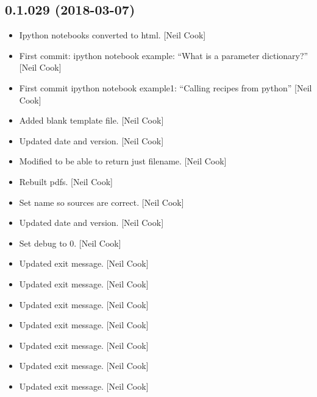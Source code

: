 \documentclass[a4paper,10pt,english]{report}
\begin{document}
\subsection{0.1.029 (2018-03-07)}
\label{\detokenize{misc/changelog:id474}}\begin{itemize}
\item {} 
Ipython notebooks converted to html. {[}Neil Cook{]}

\item {} 
First commit: ipython notebook example: “What is a parameter
dictionary?” {[}Neil Cook{]}

\item {} 
First commit ipython notebook example1: “Calling recipes from python”
{[}Neil Cook{]}

\item {} 
Added blank template file. {[}Neil Cook{]}

\item {} 
Updated date and version. {[}Neil Cook{]}

\item {} 
Modified  to be able to return just filename. {[}Neil
Cook{]}

\item {} 
Rebuilt pdfs. {[}Neil Cook{]}

\item {} 
Set  name so sources are correct. {[}Neil Cook{]}

\item {} 
Updated date and version. {[}Neil Cook{]}

\item {} 
Set debug to 0. {[}Neil Cook{]}

\item {} 
Updated exit message. {[}Neil Cook{]}

\item {} 
Updated exit message. {[}Neil Cook{]}

\item {} 
Updated exit message. {[}Neil Cook{]}

\item {} 
Updated exit message. {[}Neil Cook{]}

\item {} 
Updated exit message. {[}Neil Cook{]}

\item {} 
Updated exit message. {[}Neil Cook{]}

\item {} 
Updated exit message. {[}Neil Cook{]}


\end{itemize}
\end{document}
